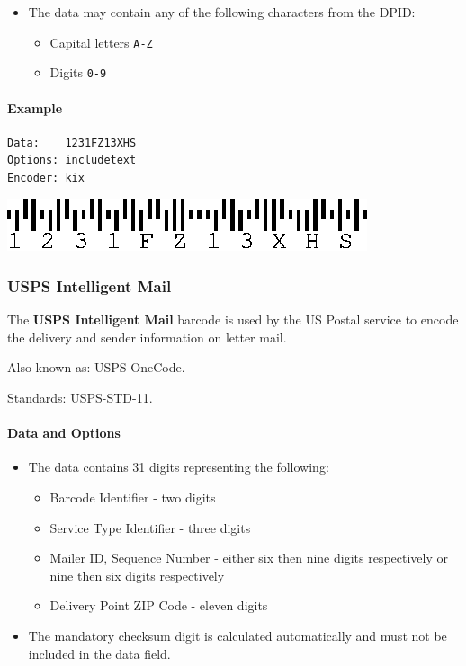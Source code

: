 \begin{itemize}
\tightlist
\item
  The data may contain any of the following characters from the DPID:

  \begin{itemize}
  \tightlist
  \item
    Capital letters \texttt{A-Z}
  \item
    Digits \texttt{0-9}
  \end{itemize}
\end{itemize}

\hypertarget{example-12}{%
\paragraph{Example}\label{example-12}}

\begin{verbatim}
Data:    1231FZ13XHS
Options: includetext
Encoder: kix
\end{verbatim}

\includegraphics{images/kix-1.eps}

\hypertarget{usps-intelligent-mail}{%
\subsubsection{USPS Intelligent Mail}\label{usps-intelligent-mail}}

The \textbf{USPS Intelligent Mail} barcode is used by the US Postal
service to encode the delivery and sender information on letter mail.

Also known as: USPS OneCode.

Standards: USPS-STD-11.

\hypertarget{data-and-options-50}{%
\paragraph{Data and Options}\label{data-and-options-50}}

\begin{itemize}
\tightlist
\item
  The data contains 31 digits representing the following:

  \begin{itemize}
  \tightlist
  \item
    Barcode Identifier - two digits
  \item
    Service Type Identifier - three digits
  \item
    Mailer ID, Sequence Number - either six then nine digits
    respectively or nine then six digits respectively
  \item
    Delivery Point ZIP Code - eleven digits
  \end{itemize}
\item
  The mandatory checksum digit is calculated automatically and must not
  be included in the data field.
\end{itemize}

